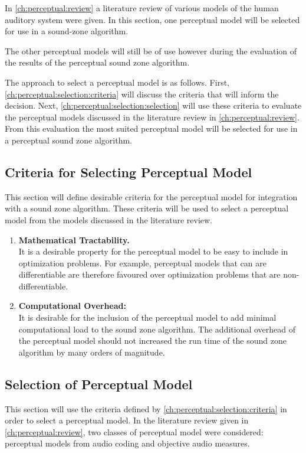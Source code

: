 In \autoref{ch:perceptual:review} a literature review of various models of the human auditory system were given.
In this section, one perceptual model will be selected for use in a sound-zone algorithm.

The other perceptual models will still be of use however during the evaluation of the results of the perceptual
sound zone algorithm.

The approach to select a perceptual model is as follows.
First, \autoref{ch:perceptual:selection:criteria} will discuss the criteria that will inform the decision.
Next, \autoref{ch:perceptual:selection:selection} will use these criteria to evaluate the perceptual models
discussed in the literature review in \autoref{ch:perceptual:review}.
From this evaluation the most suited perceptual model will be selected for use in a perceptual sound zone 
algorithm.

\subsection{Criteria for Selecting Perceptual Model}
\label{ch:perceptual:selection:criteria}
This section will define desirable criteria for the perceptual model for integration with a sound zone algorithm.
These criteria will be used to select a perceptual model from the models discussed in the literature review.
\begin{enumerate}
    \item \textbf{Mathematical Tractability.}\\
        It is a desirable property for the perceptual model to be easy to include in optimization problems.
        For example, perceptual models that can are differentiable are therefore favoured over optimization problems
        that are non-differentiable.
    \item \textbf{Computational Overhead:}\\
        It is desirable for the inclusion of the perceptual model to add minimal computational load 
        to the sound zone algorithm.
        The additional overhead of the perceptual model should not increased the run time of the sound zone algorithm by many orders of magnitude.
\end{enumerate}

\subsection{Selection of Perceptual Model}
\label{ch:perceptual:selection:selection}
This section will use the criteria defined by \autoref{ch:perceptual:selection:criteria} in order to select a perceptual
model.
In the literature review given in \autoref{ch:perceptual:review}, two classes of perceptual model were considered:
perceptual models from audio coding and objective audio measures.

